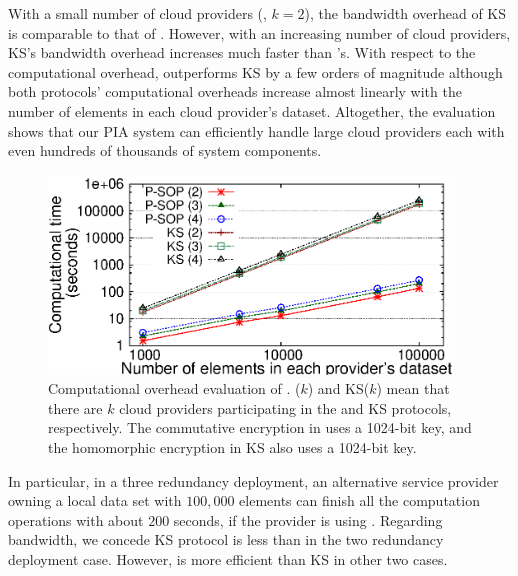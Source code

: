 With a small number of cloud providers (\eg, $k=2$),
the bandwidth overhead of KS is comparable to that of \pso.
However, with an increasing number of cloud providers,
KS's bandwidth overhead increases much faster than \pso's.
With respect to the computational overhead,
\pso outperforms KS by a few orders of magnitude although both protocols' computational overheads increase almost linearly with the number of elements in each cloud provider's dataset.
Altogether, the evaluation shows that our PIA system
can efficiently handle large
cloud providers each with even hundreds of thousands of system components.

\begin{figure}[tb] \centering
\includegraphics[width=0.96\textwidth]{figs/com.eps}
\caption[Computational overhead evaluation of \pia]{Computational
  overhead evaluation of \pia.  \pso($k$) and KS($k$) mean
  that there are $k$ cloud providers participating in the \pso and KS
  protocols, respectively. The commutative encryption in \pso 
  uses a 1024-bit key, and the homomorphic encryption in KS also 
  uses a 1024-bit key.}
\label{fig-com}
\end{figure}



In particular, in a three redundancy deployment,
an alternative service provider owning
a local data set with $100,000$ elements can finish all
the computation operations with about $200$ seconds,
if the provider is using \pso.
Regarding bandwidth, we concede KS protocol
is less than \pso in the two redundancy deployment case.
However, \pso is more efficient than KS
in other two cases.

